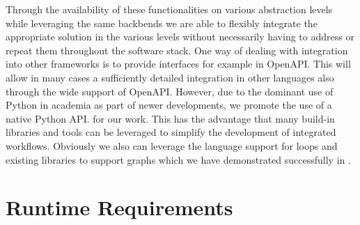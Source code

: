\documentclass[utf8]{FrontiersinVancouver} %
\begin{document}
Through the availability of these functionalities on various abstraction levels while leveraging the same backbends we are able to flexibly integrate the appropriate solution in the various levels without necessarily having to address or repeat them throughout the software stack. One way of dealing with integration into other frameworks is to provide interfaces for example in OpenAPI. This will allow in many cases a sufficiently detailed integration in other languages also through the wide support of OpenAPI. However, due to the dominant use of Python in academia as part of newer developments, we promote the use of a native Python API. for our work. This has the advantage that many build-in libraries and tools can be leveraged to simplify the development of integrated workflows. Obviously we also can leverage the language support for loops and existing libraries to support graphs which we have demonstrated successfully in \citep{cloudmesh-cc}.

\section{Runtime Requirements}
\end{document}
